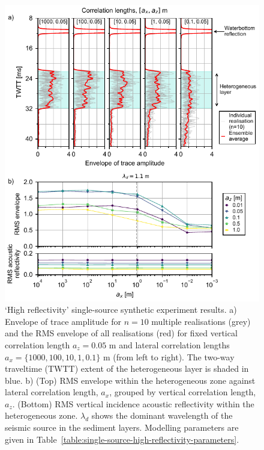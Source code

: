 \documentclass[se,manuscript]{copernicus}
\begin{document}
\begin{figure}
    \includegraphics{figures/si_fig10.pdf}
    \caption{`High reflectivity' single-source synthetic experiment results.
        a) Envelope of trace amplitude for $n=10$ multiple realisations (grey) and the RMS envelope of all realisations (red) for fixed vertical correlation length $a_z=0.05$ m and lateral correlation lengths $a_x=\{1000, 100, 10, 1, 0.1\}$ \unit{m} (from left to right).
        The two-way traveltime (TWTT) extent of the heterogeneous layer is shaded in blue.
        b) (Top) RMS envelope within the heterogeneous zone against lateral correlation length, $a_x$, grouped by vertical correlation length, $a_z$.
        (Bottom) RMS vertical incidence acoustic reflectivity within the heterogeneous zone.
        $\lambda_d$ shows the dominant wavelength of the seismic source in the sediment layers.
        Modelling parameters are given in Table~\ref{table:single-source-high-reflectivity-parameters}.}
    \label{fig:single-source-high-reflectivity} 
\end{figure}

\clearpage
\end{document}

